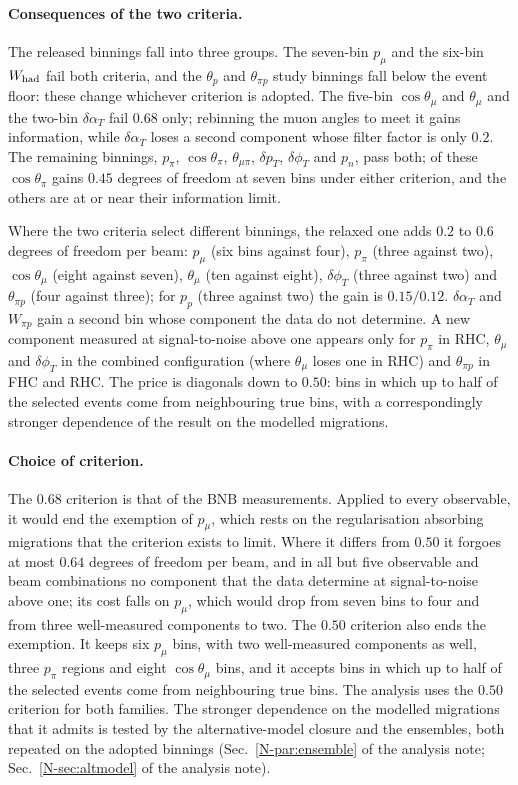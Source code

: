 \documentclass[11pt,a4paper]{article}
\newcommand{\noteref}[2]{#1~\ref{N-#2} of the analysis note}
\begin{document}
\paragraph{Consequences of the two criteria.}
The released binnings fall into three groups. The seven-bin $p_\mu$ and the six-bin $W_{\rm had}$
fail both criteria, and the $\theta_p$ and $\theta_{\pi p}$ study binnings fall below the event floor:
these change whichever criterion is adopted. The five-bin $\cos\theta_\mu$ and $\theta_\mu$ and the
two-bin $\delta\alpha_T$ fail $0.68$ only; rebinning the muon angles to meet it gains information,
while $\delta\alpha_T$ loses a second component whose filter factor is only $0.2$. The remaining
binnings, $p_\pi$, $\cos\theta_\pi$, $\theta_{\mu\pi}$, $\delta p_T$, $\delta\phi_T$ and $p_n$, pass
both; of these $\cos\theta_\pi$ gains $0.45$ degrees of freedom at seven bins under either criterion,
and the others are at or near their information limit.

Where the two criteria select different binnings, the relaxed one adds $0.2$ to $0.6$ degrees of
freedom per beam: $p_\mu$ (six bins against four), $p_\pi$ (three against two), $\cos\theta_\mu$
(eight against seven), $\theta_\mu$ (ten against eight), $\delta\phi_T$ (three against two) and
$\theta_{\pi p}$ (four against three); for $p_p$ (three against two) the gain is $0.15/0.12$.
$\delta\alpha_T$ and $W_{\pi p}$ gain a second bin whose component the data do not determine. A new component measured at signal-to-noise above one appears
only for $p_\pi$ in RHC, $\theta_\mu$ and $\delta\phi_T$ in the combined configuration (where
$\theta_\mu$ loses one in RHC) and $\theta_{\pi p}$ in FHC and RHC. The price is diagonals down to
$0.50$: bins in which up to half of the selected events come
from neighbouring true bins, with a correspondingly stronger dependence of the result on the
modelled migrations.

\paragraph{Choice of criterion.}
The $0.68$ criterion is that of the BNB measurements. Applied to every observable, it would end the
exemption of $p_\mu$, which rests on the regularisation absorbing migrations that the criterion
exists to limit. Where it differs from $0.50$ it forgoes at most $0.64$ degrees of freedom per beam,
and in all but five observable and beam combinations no component that the data determine at
signal-to-noise above one; its cost falls on $p_\mu$, which would drop from seven bins to four and
from three well-measured components to two. The $0.50$ criterion also ends the exemption. It keeps
six $p_\mu$ bins, with two well-measured components as well, three $p_\pi$ regions and eight
$\cos\theta_\mu$ bins, and it accepts bins in which up to half of the selected events come from
neighbouring true bins. The analysis uses the $0.50$ criterion for both families. The
stronger dependence on the modelled migrations that it admits is tested by the alternative-model
closure and the ensembles, both repeated on the adopted binnings
(\noteref{Sec.}{par:ensemble}; \noteref{Sec.}{sec:altmodel}).
\end{document}
